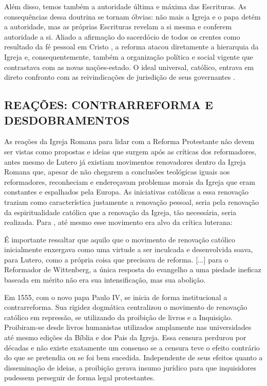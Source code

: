 \documentclass[
    article,            %
	12pt,				%
	oneside,			%
	a4paper,			%
	chapter=TITLE,		%
	section=TITLE,		%
	english,			%
	french,				%
	spanish,			%
	brazil				%
	]{abntex2}
\begin{document}
Além disso, temos também a autoridade última e máxima das Escrituras. As consequências dessa doutrina se tornam óbvias: não mais a Igreja e o papa detém a autoridade, mas as próprias Escrituras revelam a si mesma e conferem autoridade a si. Aliado a afirmação do sacerdócio de todos os crentes como resultado da fé pessoal em Cristo \cite[p.263]{CAIRNS}, a reforma atacou diretamente a hierarquia da Igreja e, consequentemente, também a organização política e social vigente que contrastava com as novas nações-estado. O ideal universal, católico, entrava em direto confronto com as reivindicações de jurisdição de seus governantes \cite[p.252]{CAIRNS}.

\subsection{REAÇÕES: CONTRARREFORMA E DESDOBRAMENTOS}
As reações da Igreja Romana para lidar com a Reforma Protestante não devem ser vistas como propostas e ideias que surgem após as críticas dos reformadores, antes mesmo de Lutero já existiam movimentos renovadores dentro da Igreja Romana que, apesar de não chegarem a conclusões teológicas iguais aos reformadores, reconheciam e endereçavam problemas morais da Igreja que eram constantes e espalhados pela Europa. As iniciativas católicas a essa renovação traziam como característica justamente a renovação pessoal, seria pela renovação da espiritualidade católica que a renovação da Igreja, tão necessária, seria realizada. Para , até mesmo esse movimento era alvo da crítica luterana:

\begin{citacao}
É importante ressaltar que aquilo que o movimento de renovação católico inicialmente enxergava como uma virtude a ser inculcada e desenvolvida soava, para Lutero, como a própria coisa que precisava de reforma. [...] para o Reformador de Wittenberg, a única resposta do evangelho a uma piedade ineficaz baseada em mérito não era sua intensificação, mas sua abolição.
\end{citacao}

Em 1555, com o novo papa Paulo IV, se inicia de forma institucional a contrarreforma. Sua rigidez dogmática centralizou o movimento de renovação católico em repressão, se utilizando da proibição de livros e a Inquisição. Proibiram-se desde livros humanistas utilizados amplamente nas universidades até mesmo edições da Bíblia e dos Pais da Igreja. Essa censura perdurou por décadas e não existe exatamente um consenso se a censura teve o efeito contrário do que se pretendia ou se foi bem sucedida. Independente de seus efeitos quanto a disseminação de ideias, a proibição gerava insumo jurídico para que inquisidores pudessem perseguir de forma legal protestantes.
\cleardoublepage
\end{document}

